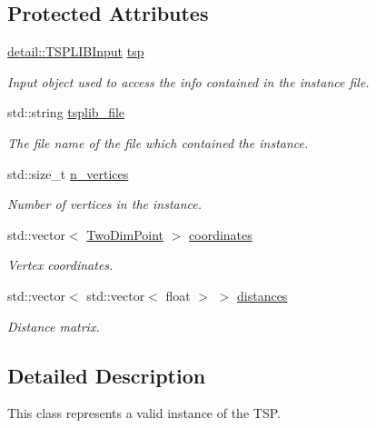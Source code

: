 \subsection*{Protected Attributes}
\begin{DoxyCompactItemize}
\item 
\hyperlink{classas_1_1tsplib_1_1detail_1_1TSPLIBInput}{detail\+::\+T\+S\+P\+L\+I\+B\+Input} \hyperlink{classas_1_1tsplib_1_1TSPInstance_a6a73219aae354011c905255dc687122b}{tsp}
\begin{DoxyCompactList}\small\item\em Input object used to access the info contained in the instance file. \end{DoxyCompactList}\item 
std\+::string \hyperlink{classas_1_1tsplib_1_1TSPInstance_a6b2d4d7ad5e12825ceee49d32cdc28af}{tsplib\+\_\+file}
\begin{DoxyCompactList}\small\item\em The file name of the file which contained the instance. \end{DoxyCompactList}\item 
std\+::size\+\_\+t \hyperlink{classas_1_1tsplib_1_1TSPInstance_af62c22d7f09f0264f5e817268230cec9}{n\+\_\+vertices}
\begin{DoxyCompactList}\small\item\em Number of vertices in the instance. \end{DoxyCompactList}\item 
std\+::vector$<$ \hyperlink{structas_1_1TwoDimPoint}{Two\+Dim\+Point} $>$ \hyperlink{classas_1_1tsplib_1_1TSPInstance_ad8e74403f222f9470bf320e5749e6d9a}{coordinates}
\begin{DoxyCompactList}\small\item\em Vertex coordinates. \end{DoxyCompactList}\item 
std\+::vector$<$ std\+::vector$<$ float $>$ $>$ \hyperlink{classas_1_1tsplib_1_1TSPInstance_a51073058c9b3f316da6b2115a9c8bec1}{distances}
\begin{DoxyCompactList}\small\item\em Distance matrix. \end{DoxyCompactList}\end{DoxyCompactItemize}


\subsection{Detailed Description}
This class represents a valid instance of the T\+SP. 

